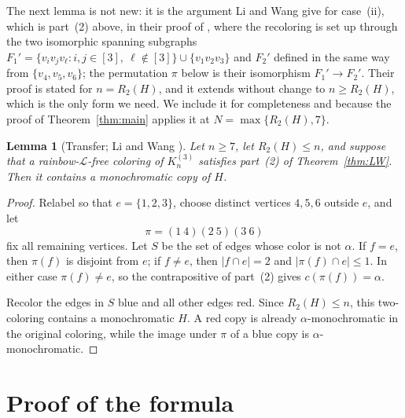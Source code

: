 \documentclass[11pt]{amsart}
\newtheorem{lemma}[theorem]{Lemma}
\newcommand{\Lpath}{\mathcal L}
\begin{document}
The next lemma is not new: it is the argument Li and Wang give for
case~(ii), which is part~(2) above, in their proof of
\cite[Theorem~1.10]{LiWang}, where the
recoloring is set up through the two isomorphic spanning subgraphs
$F_1'=\{v_iv_jv_\ell:i,j\in[3],\ \ell\notin[3]\}\cup\{v_1v_2v_3\}$ and
$F_2'$ defined in the same way from $\{v_4,v_5,v_6\}$; the permutation
$\pi$ below is their isomorphism $F_1'\to F_2'$. Their proof is stated
for $n=R_2(H)$, and it extends without change to $n\ge R_2(H)$, which is
the only form we need. We include it for completeness and because the
proof of Theorem~\ref{thm:main} applies it at $N=\max\{R_2(H),7\}$.

\begin{lemma}[Transfer; Li and Wang \cite{LiWang}]\label{lem:transfer}
Let $n\ge7$, let $R_2(H)\le n$, and suppose that a rainbow-$\Lpath$-free
coloring of $K_n^{(3)}$ satisfies part~(2) of
Theorem~\ref{thm:LW}. Then it contains a monochromatic copy of $H$.
\end{lemma}

\begin{proof}
Relabel so that $e=\{1,2,3\}$, choose distinct vertices $4,5,6$ outside
$e$, and let
\[
  \pi=(1\ 4)(2\ 5)(3\ 6)
\]
fix all remaining vertices. Let $S$ be the set of edges whose color is
not $\alpha$. If $f=e$, then $\pi(f)$ is disjoint from $e$; if $f\ne e$,
then $|f\cap e|=2$ and $|\pi(f)\cap e|\le1$. In either case
$\pi(f)\ne e$, so the contrapositive of part~(2) gives
$c(\pi(f))=\alpha$.

Recolor the edges in $S$ blue and all other edges red. Since
$R_2(H)\le n$, this two-coloring contains a monochromatic $H$. A red copy
is already $\alpha$-monochromatic in the original coloring, while the
image under $\pi$ of a blue copy is $\alpha$-monochromatic.
\end{proof}

\section{Proof of the formula}
\end{document}

